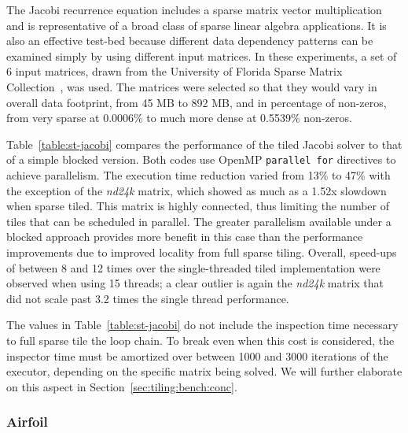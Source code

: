 The Jacobi recurrence equation includes a sparse matrix vector multiplication and is representative of a broad class of sparse linear algebra applications. It is also an effective test-bed because different data dependency patterns can be examined simply by using different input matrices. In these experiments, a set of 6 input matrices, drawn from the University of Florida Sparse Matrix Collection~\cite{ST-MatrixMarket}, was used. The matrices were selected so that they would vary in overall data footprint, from 45 MB to 892 MB, and in percentage of non-zeros, from very sparse at 0.0006\% to much more dense at 0.5539\% non-zeros. %

Table~\ref{table:st-jacobi} compares the performance of the tiled Jacobi solver to that of a simple blocked version. Both codes use OpenMP \texttt{parallel for} directives to achieve parallelism. The execution time reduction varied from 13$\%$ to 47$\%$ with the exception of the {\em nd24k} matrix, which showed as much as a 1.52x slowdown when sparse tiled. This matrix is highly connected, thus limiting the number of tiles that can be scheduled in parallel. The greater parallelism available under a blocked approach provides more benefit in this case than the performance improvements due to improved locality from full sparse tiling. Overall, speed-ups of between 8 and 12 times over the single-threaded tiled implementation were observed when using 15 threads; a clear outlier is again the {\em nd24k} matrix that did not scale past 3.2 times the single thread performance.


The values in Table~\ref{table:st-jacobi} do not include the inspection time necessary to full sparse tile the loop chain. To break even when this cost is considered, the inspector time must be amortized over between 1000 and 3000 iterations of the executor, depending on the specific matrix being solved. We will further elaborate on this aspect in Section~\ref{sec:tiling:bench:conc}.



\subsubsection{Airfoil}


